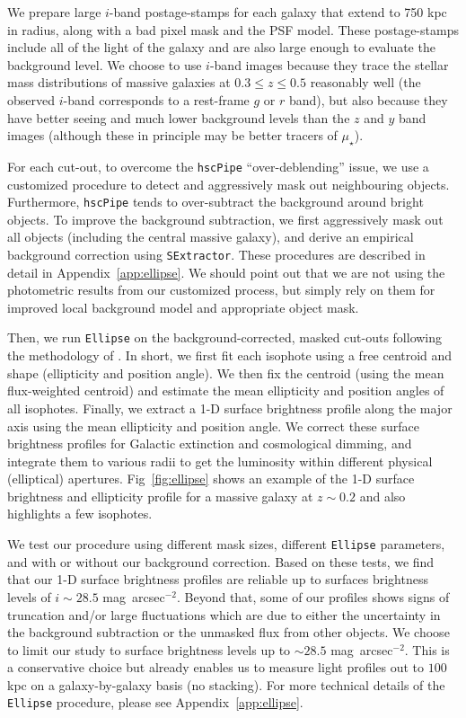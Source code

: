 \documentclass[a4paper,fleqn,usenatbib]{mnras}
\def\sb{mag~arcsec$^{-2}$}
\def\mden{{$\mu_{\star}$}}
\begin{document}
    We prepare large $i$-band postage-stamps for each galaxy that extend to 750 kpc 
    in radius, along with a bad pixel mask and the PSF model. 
    These postage-stamps include all of the light of the galaxy and are also large 
    enough to evaluate the background level. We choose to use $i$-band images 
    because they trace the stellar mass distributions of massive galaxies at 
    $0.3 \leq z \leq 0.5$ reasonably well 
    (the observed $i$-band corresponds to a rest-frame $g$ or $r$ band), but also 
    because they have better seeing and much lower background levels than the $z$ 
    and $y$ band images (although these in principle may be better tracers of 
    \mden{}). 
    
    For each cut-out, to overcome the \texttt{hscPipe} ``over-deblending'' issue, 
    we use a customized procedure to detect and aggressively mask out
    neighbouring objects. 
    Furthermore, \texttt{hscPipe} tends to over-subtract the background around 
    bright objects. 
    To improve the background subtraction, we first aggressively mask 
    out all objects (including the central massive galaxy), and derive an 
    empirical background correction using \texttt{SExtractor}.
    These procedures are described in detail in Appendix~\ref{app:ellipse}. 
    We should point out that we are not using the photometric results from our 
    customized process, but simply rely on them for improved local background model
    and appropriate object mask.

    Then, we run \texttt{Ellipse} on the background-corrected, masked cut-outs 
    following the methodology of \citet{Li2012}. 
    In short, we first fit each isophote using a free centroid and shape 
    (ellipticity and position angle). 
    We then fix the centroid (using the mean flux-weighted centroid) and estimate
    the mean ellipticity and position angles of all isophotes. 
    Finally, we extract a 1-D surface brightness profile along the major axis using 
    the mean ellipticity and position angle. 
    We correct these surface brightness profiles for Galactic extinction and 
    cosmological dimming, and integrate them to various radii to get the luminosity 
    within different physical (elliptical) apertures. 
    Fig~\ref{fig:ellipse} shows an example of the 1-D surface brightness and 
    ellipticity profile for a massive galaxy at $z{\sim}0.2$ and also highlights 
    a few isophotes.    

    We test our procedure using different mask sizes, different \texttt{Ellipse} 
    parameters, and with or without our background correction. 
    Based on these tests, we find that our 1-D surface brightness profiles are reliable 
    up to surfaces brightness levels of $i{\sim}28.5$ \sb. 
    Beyond that, some of our profiles shows signs of truncation and/or large 
    fluctuations which are due to either the uncertainty in the background 
    subtraction or the unmasked flux from other objects.
    We choose to limit our study to surface brightness levels up to ${\sim} 28.5$ \sb. 
    This is a conservative choice but already enables us to measure light profiles 
    out to $100$ kpc on a galaxy-by-galaxy basis (no stacking). 
    For more technical details of the \texttt{Ellipse} procedure, please see 
    Appendix~\ref{app:ellipse}.
\end{document}
